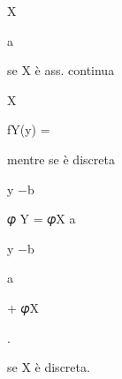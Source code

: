 \documentclass[a4paper,portrait,12pt]{article}
\begin{document}
\begin{flushleft}
X
\end{flushleft}


\begin{flushleft}
a
\end{flushleft}





\begin{flushleft}
se X \`{e} ass. continua
\end{flushleft}





\begin{flushleft}
X
\end{flushleft}





\begin{flushleft}
fY(y) =
\end{flushleft}


\begin{flushleft}
mentre se \`{e} discreta
\end{flushleft}





\begin{flushleft}
y $-$b
\end{flushleft}


\begin{flushleft}
𝜑 Y = 𝜑X a
\end{flushleft}





\begin{flushleft}
y $-$b
\end{flushleft}


\begin{flushleft}
a
\end{flushleft}





\begin{flushleft}
+ 𝜑X
\end{flushleft}





.





\begin{flushleft}
se X \`{e} discreta.
\end{flushleft}
\end{document}
